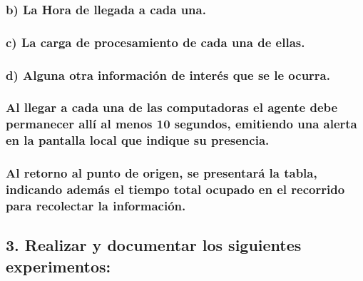 \documentclass[11pt]{article}
\begin{document}
    \hypertarget{b-la-hora-de-llegada-a-cada-una.}{%
\subsubsection{b) La Hora de llegada a cada
una.}\label{b-la-hora-de-llegada-a-cada-una.}}

    \hypertarget{c-la-carga-de-procesamiento-de-cada-una-de-ellas.}{%
\subsubsection{c) La carga de procesamiento de cada una de
ellas.}\label{c-la-carga-de-procesamiento-de-cada-una-de-ellas.}}

    \hypertarget{d-alguna-otra-informaciuxf3n-de-interuxe9s-que-se-le-ocurra.}{%
\subsubsection{d) Alguna otra información de interés que se le
ocurra.}\label{d-alguna-otra-informaciuxf3n-de-interuxe9s-que-se-le-ocurra.}}

    \hypertarget{al-llegar-a-cada-una-de-las-computadoras-el-agente-debe-permanecer-alluxed-al-menos-10-segundos-emitiendo-una-alerta-en-la-pantalla-local-que-indique-su-presencia.}{%
\subsubsection{Al llegar a cada una de las computadoras el agente debe
permanecer allí al menos 10 segundos, emitiendo una alerta en la
pantalla local que indique su
presencia.}\label{al-llegar-a-cada-una-de-las-computadoras-el-agente-debe-permanecer-alluxed-al-menos-10-segundos-emitiendo-una-alerta-en-la-pantalla-local-que-indique-su-presencia.}}

    \hypertarget{al-retorno-al-punto-de-origen-se-presentaruxe1-la-tabla-indicando-ademuxe1s-el-tiempo-total-ocupado-en-el-recorrido-para-recolectar-la-informaciuxf3n.}{%
\subsubsection{Al retorno al punto de origen, se presentará la tabla,
indicando además el tiempo total ocupado en el recorrido para recolectar
la
información.}\label{al-retorno-al-punto-de-origen-se-presentaruxe1-la-tabla-indicando-ademuxe1s-el-tiempo-total-ocupado-en-el-recorrido-para-recolectar-la-informaciuxf3n.}}

    \hypertarget{realizar-y-documentar-los-siguientes-experimentos}{%
\subsection{3. Realizar y documentar los siguientes
experimentos:}\label{realizar-y-documentar-los-siguientes-experimentos}}
\end{document}
